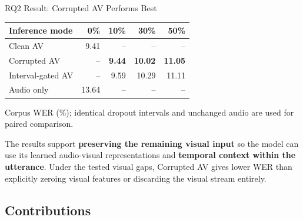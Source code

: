 \begin{frame}{RQ2 Result: Corrupted AV Performs Best}
  \small
  \centering
  \renewcommand{\arraystretch}{1.10}
  \begin{tabular}{lrrrr}
    \toprule
    Inference mode & 0\% & 10\% & 30\% & 50\% \\
    \midrule
    Clean AV & 9.41 & -- & -- & -- \\
    Corrupted AV & -- & \textbf{9.44} & \textbf{10.02} & \textbf{11.05} \\
    Interval-gated AV & -- & 9.59 & 10.29 & 11.11 \\
    Audio only & 13.64 & -- & -- & -- \\
    \bottomrule
  \end{tabular}
  \vspace{0.03cm}

  {\scriptsize Corpus WER (\%); identical dropout intervals and unchanged audio are used for paired comparison.}
  \vspace{0.08cm}

  \vspace{0.35cm}
  \begin{minipage}{0.94\textwidth}
    \raggedright
    The results support \textbf{preserving the remaining visual input} so the model can use its learned audio-visual representations and \textbf{temporal context within the utterance}. Under the tested visual gaps, Corrupted AV gives lower WER than explicitly zeroing visual features or discarding the visual stream entirely.
  \end{minipage}
  \vspace{0.25cm}

\end{frame}

\subsection{Contributions}

